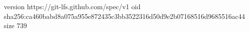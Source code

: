 version https://git-lfs.github.com/spec/v1
oid sha256:ca460babd8a075a955e872435c3bb3522316d50d9e2b07168516d9685516ac44
size 739
